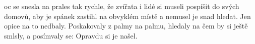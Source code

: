 \documentclass[a5paper]{article}
\begin{document}
\noindent
\unitlength=0.1mm
\noindent
oc se snesla na prales tak rychle, že zvířata i lidé si museli pospíšit do svých domovů, aby je spánek zastihl na obvyklém místě a nemusel je snad hledat. Jen opice na to nedbaly. Poskakovaly z palmy na palmu, hledaly na čem by si ještě smlsly, a posímvaly se:  Opravdu si je našel.
\end{window}
\end{document}
